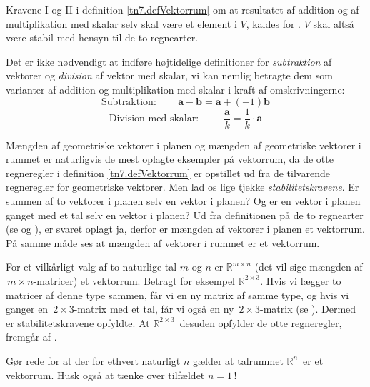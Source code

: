 \begin{info}
Kravene I og II i definition \ref{tn7.defVektorrum} om at resultatet af addition og af multiplikation med skalar selv skal være et element i $V$, kaldes for . $V$ skal altså være stabil med hensyn til de to regnearter.
\end{info}

\begin{aha}
Det er ikke nødvendigt at indføre højtidelige definitioner for \textit{subtraktion} af vektorer og \textit{division} af vektor med skalar, vi kan nemlig betragte dem som varianter af addition og multiplikation med skalar i kraft af omskrivningerne:
$$\mathrm{Subtraktion:}\quad\quad \mathbf a - \mathbf b =\mathbf a +(-1) \mathbf b$$
$$\mathrm{Division\,\, med\,\, skalar:}\quad\quad\,\, \frac {\mathbf a} k = \frac 1 k \cdot \mathbf a$$
\end{aha}

Mængden af geometriske vektorer i planen og mængden af geometriske vektorer i rummet er naturligvis de mest oplagte eksempler på vektorrum, da de otte regneregler i definition \ref{tn7.defVektorrum} er opstillet ud fra de tilvarende regneregler for geometriske vektorer. Men lad os lige tjekke \textit{stabilitetskravene}. Er summen af to vektorer i planen selv en vektor i planen? Og er en vektor i planen ganget med et tal selv en vektor i planen? Ud fra definitionen på de to regnearter (se  og ), er svaret oplagt ja, derfor er mængden af vektorer i planen et vektorrum. På samme måde ses at mængden af vektorer i rummet er et vektorrum.

\begin{example}
For et vilkårligt valg af to naturlige tal $m$ og $n$ er $\mathbb R^{m \times n}$ (det vil sige mængden af $\,m\times n$-matricer) et vektorrum. \bs
Betragt for eksempel $\mathbb R^{2 \times 3}$. Hvis vi lægger to matricer af denne type sammen, får vi en ny matrix af samme type, og hvis vi ganger en $\,2\times 3$-matrix med et tal, får vi også en ny $\,2\times 3$-matrix (se ). Dermed er stabilitetskravene opfyldte. At $\mathbb R^{2 \times 3}\,$ desuden opfylder de otte regneregler, fremgår af  .
\end{example}

\begin{exercise}
Gør rede for at der for ethvert naturligt $n$ gælder at talrummet $\mathbb R^n\,$ er et vektorrum. Husk også at tænke over tilfældet $n=1\,$!
\end{exercise}

